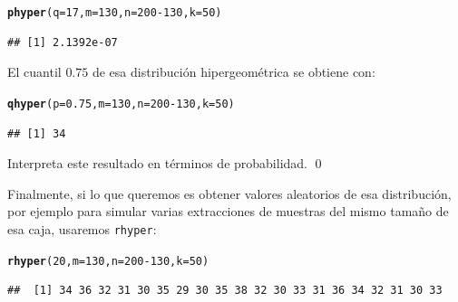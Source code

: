 \documentclass[10pt,a4paper]{article}\usepackage[]{graphicx}\usepackage[]{color}
\makeatletter
\newcommand{\hlnum}[1]{\textcolor[rgb]{0.686,0.059,0.569}{#1}}%
\newcommand{\hlopt}[1]{\textcolor[rgb]{0,0,0}{#1}}%
\newcommand{\hlstd}[1]{\textcolor[rgb]{0.345,0.345,0.345}{#1}}%
\newcommand{\hlkwc}[1]{\textcolor[rgb]{0.333,0.667,0.333}{#1}}%
\newcommand{\hlkwd}[1]{\textcolor[rgb]{0.737,0.353,0.396}{\textbf{#1}}}%
\newenvironment{kframe}{%
 \def\at@end@of@kframe{}%
 \ifinner\ifhmode%
  \def\at@end@of@kframe{\end{minipage}}%
  \begin{minipage}{\columnwidth}%
 \fi\fi%
 \def\FrameCommand##1{\hskip\@totalleftmargin \hskip-\fboxsep
 \colorbox{shadecolor}{##1}\hskip-\fboxsep
     \hskip-\linewidth \hskip-\@totalleftmargin \hskip\columnwidth}%
 \MakeFramed {\advance\hsize-\width
   \@totalleftmargin\z@ \linewidth\hsize
   \@setminipage}}%
 {\par\unskip\endMakeFramed%
 \at@end@of@kframe}
\newenvironment{knitrout}{}{} %
\makeatother
\begin{document}
\begin{knitrout}
\color{fgcolor}\begin{kframe}
\begin{alltt}
\hlkwd{phyper}\hlstd{(}\hlkwc{q} \hlstd{=} \hlnum{17}\hlstd{,} \hlkwc{m} \hlstd{=} \hlnum{130}\hlstd{,} \hlkwc{n} \hlstd{=} \hlnum{200} \hlopt{-} \hlnum{130}\hlstd{,} \hlkwc{k} \hlstd{=} \hlnum{50}\hlstd{)}
\end{alltt}
\begin{verbatim}
## [1] 2.1392e-07
\end{verbatim}
\end{kframe}
\end{knitrout}

El cuantil $0.75$ de esa distribución hipergeométrica se obtiene con:

\begin{knitrout}
\color{fgcolor}\begin{kframe}
\begin{alltt}
\hlkwd{qhyper}\hlstd{(}\hlkwc{p} \hlstd{=} \hlnum{0.75}\hlstd{,} \hlkwc{m} \hlstd{=} \hlnum{130}\hlstd{,} \hlkwc{n} \hlstd{=} \hlnum{200} \hlopt{-} \hlnum{130}\hlstd{,} \hlkwc{k} \hlstd{=} \hlnum{50}\hlstd{)}
\end{alltt}
\begin{verbatim}
## [1] 34
\end{verbatim}
\end{kframe}
\end{knitrout}

\begin{ejercicio}
\label{tut12:ejercicio06}
Interpreta este resultado en términos de probabilidad.
\qed
\end{ejercicio}

Finalmente, si lo que queremos es obtener valores aleatorios de esa distribución, por ejemplo para simular varias extracciones de muestras del mismo tamaño de esa caja, usaremos {\tt rhyper}:

\begin{knitrout}
\color{fgcolor}\begin{kframe}
\begin{alltt}
\hlkwd{rhyper}\hlstd{(}\hlnum{20}\hlstd{,} \hlkwc{m} \hlstd{=} \hlnum{130}\hlstd{,} \hlkwc{n} \hlstd{=} \hlnum{200} \hlopt{-} \hlnum{130}\hlstd{,} \hlkwc{k} \hlstd{=} \hlnum{50}\hlstd{)}
\end{alltt}
\begin{verbatim}
##  [1] 34 36 32 31 30 35 29 30 35 38 32 30 33 31 36 34 32 31 30 33
\end{verbatim}
\end{kframe}
\end{knitrout}
\end{document}
